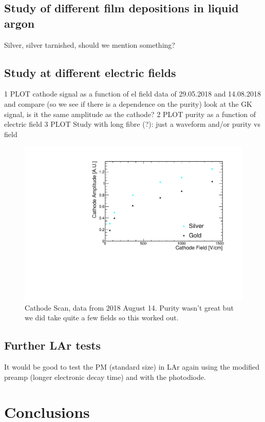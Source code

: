 \documentclass[a4paper,11pt]{article}
\begin{document}
\subsection{Study of different film depositions in liquid argon}
Silver, silver tarnished, should we mention something?

\subsection{Study at different electric fields}
1 PLOT cathode signal as a function of el field
data of 29.05.2018 and 14.08.2018 and compare (so we see if there is a dependence on the purity)
look at the GK signal, is it the same amplitude as the cathode?
2 PLOT purity as a function of electric field 
3 PLOT Study with long fibre (?): just a waveform and/or purity vs field 

\begin{figure}
    \centering
    \includegraphics[width=.7\linewidth]{figures/CathodeScan2018Aug14_ShortFibre_SilverGold.pdf}
    \caption{Cathode Scan, data from 2018 August 14. Purity wasn't great but we did take quite a few fields so this worked out.}
    \label{fig:cathodeScan}
\end{figure}

\subsection{Further LAr tests}
It would be good to test the PM (standard size) in LAr again using the modified preamp (longer electronic decay time) and with the photodiode. 

\section{Conclusions}
\end{document}

